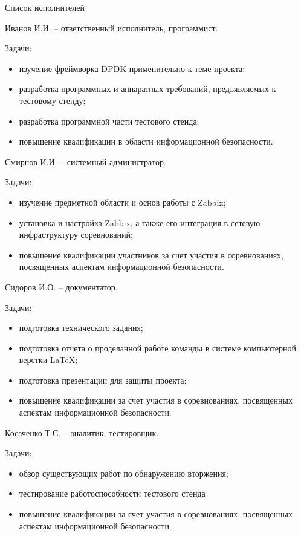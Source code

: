 \begin{center}
Список исполнителей
\end{center}

Иванов И.И. -- ответственный исполнитель, программист.\par 
Задачи:
\begin{itemize}
\item изучение фреймворка DPDK применительно к теме проекта;
\item разработка программных и аппаратных требований, предъявляемых к тестовому стенду;
\item разработка программной части тестового стенда;
\item повышение квалификации в области информационной безопасности.
\end{itemize}

Смирнов И.И. -- системный администратор.\par
Задачи:
\begin{itemize}
\item изучение предметной области и основ работы с Zabbix;
\item установка и настройка Zabbix, а также его интеграция в сетевую инфраструктуру соревнований;
\item повышение квалификации участников за счет участия в соревнованиях, посвященных аспектам информационной безопасности.
\end{itemize}

Сидоров И.О. -- документатор.\par
Задачи:
\begin{itemize}
\item подготовка технического задания;
\item подготовка отчета о проделанной работе команды в системе компьютерной верстки \LaTeX ;
\item подготовка презентации для защиты проекта;
\item повышение квалификации за счет участия в соревнованиях, посвященных аспектам информационной безопасности.
\end{itemize}

Косаченко Т.С. -- аналитик, тестировщик.\par
Задачи:
\begin{itemize}
\item обзор существующих работ по обнаружению вторжения;
\item тестирование работоспособности тестового стенда
\item повышение квалификации за счет участия в соревнованиях, посвященных аспектам информационной безопасности.
\end{itemize}

